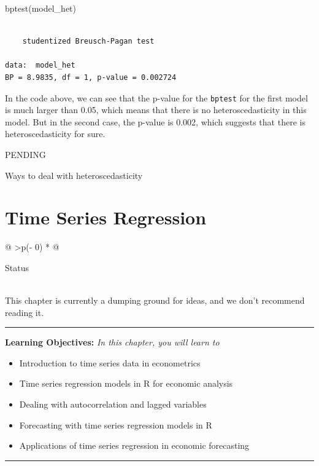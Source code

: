 \documentclass[
  letterpaper,
  paper =a4,
  twoside,
  openright,
  headsepline,
  footsepline,
  listof = totocnumbered,
  chapterprefix = true,
  firstiscover,
  parskip = full*]{scrbook}
\newenvironment{Shaded}{\begin{snugshade}}{\end{snugshade}}
\newcommand{\FunctionTok}[1]{\textcolor[rgb]{0.28,0.35,0.67}{#1}}
\newcommand{\NormalTok}[1]{\textcolor[rgb]{0.00,0.23,0.31}{#1}}
\providecommand{\abstractname}{Learning Objectives} %
\newenvironment{objectives}[1]{%
	\hrule
	\vspace{5pt}
	\small\textbf{\abstractname: } 
	\newline
	\vspace{0.1cm}
	\small\emph{#1} %
	\itshape %
}{%
	\vspace{5pt}
	\hrule
	\vspace{0.6cm}
}
\begin{document}
\begin{Shaded}
\begin{Highlighting}[]
\FunctionTok{bptest}\NormalTok{(model\_het)}
\end{Highlighting}
\end{Shaded}

\begin{verbatim}

    studentized Breusch-Pagan test

data:  model_het
BP = 8.9835, df = 1, p-value = 0.002724
\end{verbatim}

In the code above, we can see that the p-value for the \texttt{bptest}
for the first model is much larger than 0.05, which means that there is
no heteroscedasticity in this model. But in the second case, the p-value
is 0.002, which suggests that there is heteroscedasticity for sure.

PENDING

Ways to deal with heteroscedasticity


\chapter{Time Series Regression}\label{time-series-regression}

\begin{longtable}[]{@{}
  >{\centering\arraybackslash}p{(\columnwidth - 0\tabcolsep) * }@{}}
\toprule\noalign{}
\begin{minipage}[b]{\linewidth}\centering
Status
\end{minipage} \\
\midrule\noalign{}
\endhead
\bottomrule\noalign{}
\endlastfoot
This chapter is currently a dumping ground for ideas, and we don't
recommend reading it. \\
\end{longtable}

\begin{objectives}{In this chapter, you will learn to}
\begin{itemize}

\item{Introduction to time series data in econometrics}

\item{Time series regression models in R for economic analysis}

\item{Dealing with autocorrelation and lagged variables}

\item{Forecasting with time series regression models in R}

\item{Applications of time series regression in economic forecasting}

\end{itemize}

\end{objectives}
\end{document}
